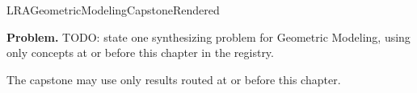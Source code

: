 \ifcsname LRAGeometricModelingCapstoneRendered\endcsname
\else
\expandafter\gdef\csname LRAGeometricModelingCapstoneRendered\endcsname{}

\newpage
{}
\label{cap:geometric-modeling}

\begin{tcolorbox}[
  colback=gray!6,
  colframe=gray!40,
  arc=2pt,
  left=8pt, right=8pt, top=6pt, bottom=6pt,
  title={\small\textbf{Capstone Problem}},
  fonttitle=\small\bfseries
]
\textbf{Problem.}
TODO: state one synthesizing problem for Geometric Modeling, using only concepts at or
before this chapter in the registry.
\end{tcolorbox}

\begin{remark*}
The capstone may use only results routed at or before this chapter.
\end{remark*}

\clearpage
\fi
